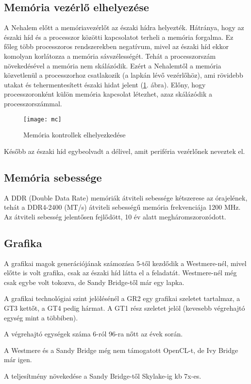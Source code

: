 \subsection{Memória vezérlő elhelyezése}
A Nehalem előtt a memóriavezérlőt az északi hídra helyezték.
Hátránya, hogy az északi híd és a processzor közötti kapcsolatot terheli a memória forgalma.
Ez főleg több processzoros rendszerekben negatívum, mivel az északi híd ekkor komolyan korlátozza a memória sávszélességét.
Tehát a processzorszám növekedésével a memória nem skálázódik.
Ezért a Nehalemtől a memória közvetlenül a processzorhoz csatlakozik (a lapkán lévő vezérlőhöz), ami rövidebb utakat és tehermentesített északi hidat jelent (\ref{fig:mc}. ábra).
Előny, hogy processzoronként külön memória kapcsolat létezhet, azaz skálázódik a processzorszámmal.
\begin{figure}[H]
    \texttt{[image: mc]}
    \centering
    \caption{Memória kontrollek elhelyezkedése}
    \label{fig:mc}
\end{figure}
Később az északi híd egybeolvadt a délivel, amit periféria vezérlőnek neveztek el.

\subsection{Memória sebessége}
A DDR (Double Data Rate) memóriák átviteli sebessége kétszerese az órajelének, tehát a DDR4-2400 (MT/s) átviteli sebességű memória frekvenciája 1200 MHz.
Az átviteli sebesség jelentősen fejlődött, 10 év alatt megháromszorozódott.

\subsection{Grafika}
A grafikai magok generációjának számozása 5-től kezdődik a Westmere-nél, mivel előtte is volt grafika, csak az északi híd látta el a feladatát.
Westmere-nél még csak egybe volt tokozva, de Sandy Bridge-től már egy lapka.

A grafikai technológiai szint jelölésénél a GR2 egy grafikai szeletet tartalmaz, a GT3 kettőt, a GT4 pedig hármat.
A GT1 rész szeletet jelöl (kevesebb végrehajtó egység mint a többiben).

A végrehajtó egységek száma 6-ról 96-ra nőtt az évek során.

A Westmere és a Sandy Bridge még nem támogatott OpenCL-t, de Ivy Bridge már igen.

A teljesítmény növekedése a Sandy Bridge-től Skylake-ig kb 7x-es.

